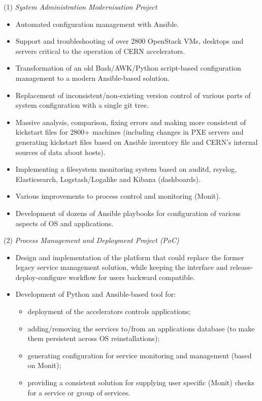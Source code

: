 \documentclass[$fontsize$, a4paper]{article}
\begin{document}
\vspace{5pt}
(1) \emph{System Administration Modernisation Project}
\begin{itemize}
  \item Automated configuration management with Ansible.
  \item Support and troubleshooting of over 2800 OpenStack VMs, desktops and servers critical to the operation of CERN accelerators.
  \item Transformation of an old Bash/AWK/Python script-based configuration management to a modern Ansible-based solution.
  \item Replacement of inconsistent/non-existing version control of various parts of system configuration with a single git tree.
  \item Massive analysis, comparison, fixing errors and making more consistent of kickstart files for 2800+ machines (including changes in PXE servers and generating kickstart files based on Ansible inventory file and CERN's internal sources of data about hosts).
  \item Implementing a filesystem monitoring system based on auditd, rsyslog, Elasticsearch, Logstash/Logalike and Kibana (dashboards).
  \item Various improvements to process control and monitoring (Monit).
  \item Development of dozens of Ansible playbooks for configuration of various aspects of OS and applications.
\end{itemize}

\pagebreak
(2) \emph{Process Management and Deployment Project (PoC)}
\begin{itemize}
  \item Design and implementation of the platform that could replace the former legacy service management solution,
  while keeping the interface and release-deploy-configure workflow for users backward compatible.
  \item Development of Python and Ansible-based tool for:
  \begin{itemize}
    \item deployment of the accelerators controls applications;
    \item adding/removing the services to/from an applications database (to make them persistent across OS reinstallations);
    \item generating configuration for service monitoring and management (based on Monit);
    \item providing a consistent solution for supplying user specific (Monit) checks for a service or group of services.
  \end{itemize}
\end{itemize}
\end{document}
